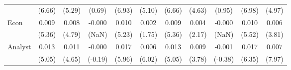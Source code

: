 \begin{table}[H]
{\begin{tabular}{lcccccccccc}
   & (6.66) & (5.29) & (0.69) & (6.93) & (5.10) & (6.66) & (4.63) & (0.95) & (6.98) & (4.97) \\ 
  Econ & 0.009 & 0.008 & -0.000 & 0.010 & 0.002 & 0.009 & 0.004 & -0.000 & 0.010 & 0.006 \\ 
   & (5.36) & (4.79) & (NaN) & (5.23) & (1.75) & (5.36) & (2.17) & (NaN) & (5.52) & (3.81) \\ 
  Analyst & 0.013 & 0.011 & -0.000 & 0.017 & 0.006 & 0.013 & 0.009 & -0.001 & 0.017 & 0.007 \\ 
   & (5.05) & (4.65) & (-0.19) & (5.96) & (6.02) & (5.05) & (3.78) & (-0.38) & (6.35) & (7.97) \\ 
   \hline 
\end{tabular}
}
\end{table}
